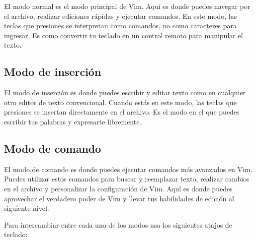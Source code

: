 \documentclass[
  a4paper,
]{article}
\begin{document}
El modo normal es el modo principal de Vim. Aquí es donde puedes navegar
por el archivo, realizar ediciones rápidas y ejecutar comandos. En este
modo, las teclas que presiones se interpretan como comandos, no como
caracteres para ingresar. Es como convertir tu teclado en un control
remoto para manipular el texto.

\hypertarget{modo-de-inserciuxf3n}{%
\subsection{Modo de inserción}\label{modo-de-inserciuxf3n}}

El modo de inserción es donde puedes escribir y editar texto como en
cualquier otro editor de texto convencional. Cuando estás en este modo,
las teclas que presiones se insertan directamente en el archivo. Es el
modo en el que puedes escribir tus palabras y expresarte libremente.

\hypertarget{modo-de-comando}{%
\subsection{Modo de comando}\label{modo-de-comando}}

El modo de comando es donde puedes ejecutar comandos más avanzados en
Vim. Puedes utilizar estos comandos para buscar y reemplazar texto,
realizar cambios en el archivo y personalizar la configuración de Vim.
Aquí es donde puedes aprovechar el verdadero poder de Vim y llevar tus
habilidades de edición al siguiente nivel.

Para intercambiar entre cada uno de los modos usa los siguientes atajos
de teclado:
\end{document}

